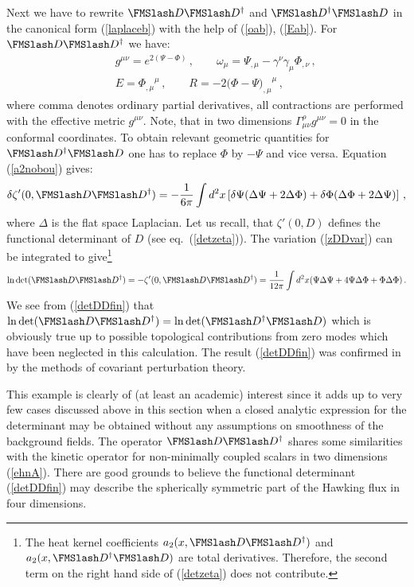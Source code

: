 Next we have to rewrite $\Dir\Dir^\dag$ and $\Dir^\dag\Dir$ in the
canonical form (\ref{laplaceb}) with the help of (\ref{oab}),
(\ref{Eab}). For $\Dir\Dir^\dag$ we have:
\begin{eqnarray}
&&g^{\mu\nu}=e^{2(\Psi -\Phi )}\,,\qquad \omega_\mu =
\Psi_{,\mu} -\gamma^\nu\gamma_\mu \Phi_{,\nu} \,,\nonumber\\
&&E={\Phi_{,\mu}}^\mu \,,\qquad R =-2(\Phi -\Psi {)_{,\mu}}^\mu\,,
\label{DDdef}
\end{eqnarray}
where comma denotes ordinary partial derivatives, all contractions
are performed with the effective metric $g^{\mu\nu}$. Note, that in
two dimensions $\Gamma^\rho_{\mu\nu}g^{\mu\nu}=0$ in the conformal
coordinates. To obtain relevant geometric quantities for $\Dir^\dag\Dir$
one has to replace $\Phi$ by $-\Psi$ and vice versa. Equation
(\ref{a2nobou}) gives:
\begin{equation}
\delta \zeta'(0,\Dir\Dir^\dag )=-\frac 1{6\pi}\int d^2x
\left[ \delta\Psi (\Delta \Psi +2\Delta\Phi )
+\delta\Phi (\Delta\Phi +2\Delta\Psi )\right]\,,\label{zDDvar}
\end{equation}
where $\Delta$ is the flat space Laplacian. Let us recall, that 
$\zeta'(0,D)$ defines the functional determinant of $D$ (see
eq.\ (\ref{detzeta})). The variation (\ref{zDDvar}) can be integrated
to give\footnote{The heat kernel coefficients $a_2(x,\Dir\Dir^\dag )$
and $a_2(x,\Dir^\dag\Dir )$ are total derivatives. Therefore,
the second term on the right hand side of (\ref{detzeta}) does not
contribute.}
\begin{equation}
\ln\det (\Dir\Dir^\dag)=-\zeta'(0,\Dir\Dir^\dag)=
\frac 1{12\pi} \int d^2x (\Psi \Delta \Psi +4\Psi\Delta\Phi
+\Phi\Delta\Phi )\,.\label{detDDfin}
\end{equation}
We see from (\ref{detDDfin})
that $\ln \det (\Dir\Dir^\dag)=\ln \det (\Dir^\dag\Dir )$
which is obviously true 
up to possible topological contributions from zero modes which have
been neglected in this calculation. The result (\ref{detDDfin}) was
confirmed in \cite{Gusev:1999cv} by the methods of covariant perturbation
theory.

This example is clearly of (at least an academic) 
interest since it adds up to very
few cases discussed above in this section when a closed analytic
expression for the determinant may be obtained without any assumptions 
on smoothness of the background fields.    
The operator $\Dir\Dir^\dag$ shares some similarities with 
the kinetic operator
for non-minimally coupled scalars in two dimensions (\ref{ehnA}).
There are good grounds to believe 
\cite{Kummer:1999zy} the functional determinant (\ref{detDDfin})
may describe the spherically symmetric part of the Hawking flux in four
dimensions.

